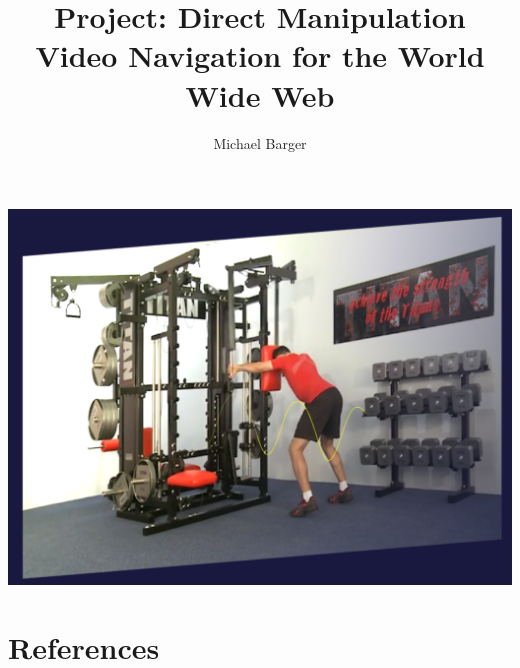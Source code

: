 \documentclass{report}
\begin{document}
\title{Project: Direct Manipulation Video Navigation for the World Wide Web}
\author{Michael Barger}
\maketitle

\includegraphics[width=\textwidth]{img1}





\chapter*{References}
\end{document}
